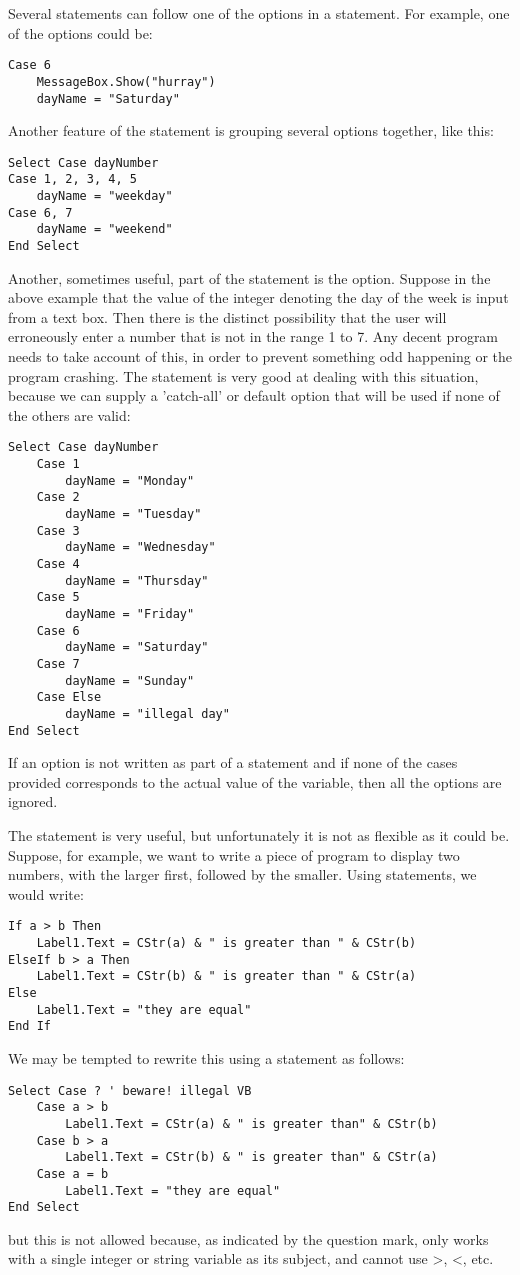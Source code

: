 		Several statements can follow one of the options in a  statement. For example, one of the options could be:
		\begin{lstlisting}
Case 6
	MessageBox.Show("hurray")
	dayName = "Saturday"
		\end{lstlisting}
Another feature of the  statement is grouping several options together, like this:
\begin{lstlisting}
Select Case dayNumber
Case 1, 2, 3, 4, 5
	dayName = "weekday"
Case 6, 7
	dayName = "weekend"
End Select
\end{lstlisting}
		Another, sometimes useful, part of the  statement is the  option. Suppose in the above example that the value of the integer denoting the day of the week is input from a text box. Then there is the distinct possibility that the user will erroneously enter a number that is not in the range 1 to 7. Any decent program needs to take account of this, in order to prevent something odd happening or the program crashing. The  statement is very good at dealing with this situation, because we can supply a 'catch-all' or default option that will be used if none of the others are valid:
		\begin{lstlisting}
Select Case dayNumber
	Case 1
		dayName = "Monday"
	Case 2
		dayName = "Tuesday"
	Case 3
		dayName = "Wednesday"
	Case 4
		dayName = "Thursday"
	Case 5
		dayName = "Friday"
	Case 6
		dayName = "Saturday"
	Case 7
		dayName = "Sunday"
	Case Else
		dayName = "illegal day"
End Select
		\end{lstlisting}
		If an  option is not written as part of a  statement and if none of the cases provided corresponds to the actual value of the variable, then all the options are ignored.

		The  statement is very useful, but unfortunately it is not as flexible as it could be. Suppose, for example, we want to write a piece of program to display two numbers, with the larger first, followed by the smaller. Using  statements, we would write:
		\begin{lstlisting}
If a > b Then
	Label1.Text = CStr(a) & " is greater than " & CStr(b)
ElseIf b > a Then
	Label1.Text = CStr(b) & " is greater than " & CStr(a)
Else
	Label1.Text = "they are equal"
End If
		\end{lstlisting}
		We may be tempted to rewrite this using a  statement as follows:
		\begin{lstlisting}
Select Case ? ' beware! illegal VB
	Case a > b
		Label1.Text = CStr(a) & " is greater than" & CStr(b)
	Case b > a
		Label1.Text = CStr(b) & " is greater than" & CStr(a)
	Case a = b
		Label1.Text = "they are equal"
End Select
		\end{lstlisting}
		but this is not allowed because, as indicated by the question mark,  only works with a single integer or string variable as its subject, and  cannot use >, <, etc.


